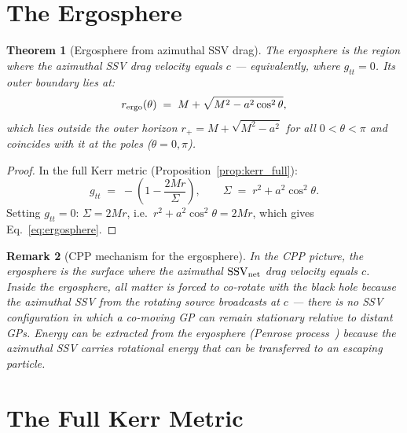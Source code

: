 \documentclass[12pt]{article}
\newtheorem{theorem}{Theorem}[section]
\newtheorem{remark}[theorem]{Remark}
\newcommand{\rplus}{r_+}
\newcommand{\SSV}{\mathrm{SSV}}
\newcommand{\Sig}{\Sigma}
\begin{document}
\section{The Ergosphere}
\label{sec:ergosphere}

\begin{theorem}[Ergosphere from azimuthal SSV drag]
\label{thm:ergosphere}
The ergosphere is the region where the azimuthal SSV drag velocity
equals $c$ — equivalently, where $g_{tt} = 0$.  Its outer boundary
lies at:
\begin{equation}
  r_{\rm ergo}(\theta) \;=\; M + \sqrt{M^2 - a^2\cos^2\theta},
  \label{eq:ergosphere}
\end{equation}
which lies outside the outer horizon $\rplus = M + \sqrt{M^2-a^2}$
for all $0 < \theta < \pi$ and coincides with it at the poles
($\theta = 0, \pi$).
\end{theorem}

\begin{proof}
In the full Kerr metric (Proposition~\ref{prop:kerr_full}):
\begin{equation}
  g_{tt} \;=\; -\!\left(1 - \frac{2Mr}{\Sig}\right),
  \qquad \Sig \;=\; r^2 + a^2\cos^2\theta.
  \label{eq:gtt_kerr}
\end{equation}
Setting $g_{tt} = 0$: $\Sig = 2Mr$, i.e.\ $r^2 + a^2\cos^2\theta
= 2Mr$, which gives Eq.~\eqref{eq:ergosphere}.
\end{proof}

\begin{remark}[CPP mechanism for the ergosphere]
In the CPP picture, the ergosphere is the surface where the azimuthal
$\SSV_{\rm net}$ drag velocity equals $c$.  Inside the ergosphere,
all matter is forced to co-rotate with the black hole because the
azimuthal SSV from the rotating source broadcasts at $c$ — there is
no SSV configuration in which a co-moving GP can remain stationary
relative to distant GPs.  Energy can be extracted from the ergosphere
(Penrose process~\cite{penrose1969}) because the azimuthal SSV carries
rotational energy that can be transferred to an escaping particle.
\end{remark}

\section{The Full Kerr Metric}
\label{sec:kerr_full}
\end{document}
